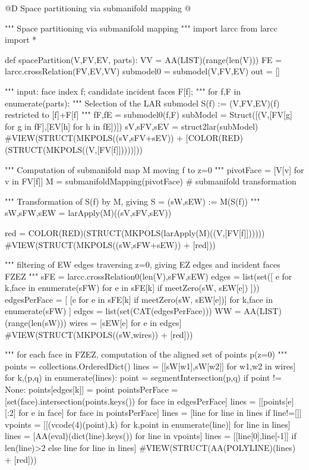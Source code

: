 \documentclass[11pt,oneside]{article}    %
\begin{document}
@D Space partitioning via submanifold mapping
@{""" Space partitioning via submanifold mapping """
import larcc
from larcc import *

def spacePartition(V,FV,EV, parts):
    VV = AA(LIST)(range(len(V)))
    FE = larcc.crossRelation(FV,EV,VV)
    submodel0 = submodel(V,FV,EV)
    out = []
    
    """ input: face index f; candidate incident faces F[f]; """
    for f,F in enumerate(parts):
        """ Selection of the LAR submodel S(f) := (V,FV,EV)(f) restricted to [f]+F[f] """    
        fF,fE = submodel0(f,F)
        subModel = Struct([(V,[FV[g] for g in fF],[EV[h] for h in fE])])
        sV,sFV,sEV = struct2lar(subModel)
        #VIEW(STRUCT(MKPOLS((sV,sFV+sEV)) + [COLOR(RED)(STRUCT(MKPOLS((V,[FV[f]]))))]))
        
        """ Computation of submanifold map M moving f to z=0 """
        pivotFace = [V[v] for v in FV[f]]
        M = submanifoldMapping(pivotFace)  # submanifold transformation
        
        """ Transformation of S(f) by M, giving S = (sW,sEW) := M(S(f)) """
        sW,sFW,sEW = larApply(M)((sV,sFV,sEV))
        
        red = COLOR(RED)(STRUCT(MKPOLS(larApply(M)((V,[FV[f]])))))
        #VIEW(STRUCT(MKPOLS((sW,sFW+sEW)) + [red]))
        
        """ filtering of EW edges traversing z=0, giving EZ edges and incident faces FZEZ """
        sFE = larcc.crossRelation0(len(V),sFW,sEW)    
        edges = list(set([ e for k,face in enumerate(sFW)  for e in sFE[k] 
                    if meetZero(sW, sEW[e]) ]))
        edgesPerFace = [ [e for e in sFE[k] if meetZero(sW, sEW[e])] 
                    for k,face in enumerate(sFW) ]
        edges = list(set(CAT(edgesPerFace)))
        WW = AA(LIST)(range(len(sW)))
        wires = [sEW[e] for e in edges]
        #VIEW(STRUCT(MKPOLS((sW,wires)) + [red]))
        
        """ for each face in FZEZ, computation of the aligned set of points p(z=0) """
        points = collections.OrderedDict()
        lines = [[sW[w1],sW[w2]] for w1,w2 in wires]
        for k,(p,q) in enumerate(lines): 
            point = segmentIntersection(p,q)
            if point != None: points[edges[k]] = point
        pointsPerFace = [set(face).intersection(points.keys()) for face in edgesPerFace]
        lines = [[points[e][:2] for e in face] for face in pointsPerFace]
        lines = [line for line in lines if line!=[]]
        vpoints = [[(vcode(4)(point),k) for k,point in enumerate(line)] for line in lines]
        lines = [AA(eval)(dict(line).keys()) for line in vpoints]
        lines = [[line[0],line[-1]]  if len(line)>2 else line for line in lines]
        #VIEW(STRUCT(AA(POLYLINE)(lines) + [red]))
                
}
\end{document}
